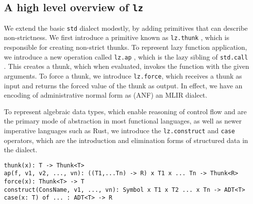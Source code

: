 \documentclass[sigplan,\review anonymous]{acmart}
\newcommand{\case}{\texttt{case} }
\newcommand{\lzap}{\texttt{lz.ap} }
\newcommand{\lzthunk}{\texttt{lz.thunk} }
\newcommand{\construct}{\texttt{lz.construct} }
\newcommand{\stdcall}{\texttt{std.call} }
\newcommand{\std}{\texttt{std} }
\newcommand{\lz}{\texttt{lz} }
\newcommand{\lzforce}{\texttt{lz.force}}
\begin{document}
\subsection{A high level overview of \lz}
We extend the basic \std dialect modestly, by adding primitives that can 
describe non-strictness. We first introduce a primitive known as \lzthunk,
which is responsible for creating non-strict thunks. 
To represent lazy function application, we introduce a new operation called \lzap,
which is the lazy sibling of \stdcall. This creates a thunk, which when evaluated,
invokes the function with the given arguments. To force
a thunk, we introduce \lzforce, which receives a thunk as input and returns
the forced value of the thunk as output. In effect, we have an encoding of
administrative normal form as (ANF) an MLIR dialect.

To represent algebraic data types, which enable reasoning of control flow 
and are the primary mode of abstraction in most functional languages, as
well as newer imperative languages such as Rust, we introduce the \construct
and \case operators, which are the introduction and elimination forms of
structured data in the dialect.

\begin{figure*}[hbt!]
\begin{verbatim}
thunk(x): T -> Thunk<T>
ap(f, v1, v2, ..., vn): ((T1,...Tn) -> R) x T1 x ... Tn -> Thunk<R>
force(x): Thunk<T> -> T
construct(ConsName, v1, ..., vn): Symbol x T1 x T2 ... x Tn -> ADT<T>
case(x: T) of ... : ADT<T> -> R
\end{verbatim}
\caption{Syntax of \lz extensions}
\end{figure*}
\end{document}

